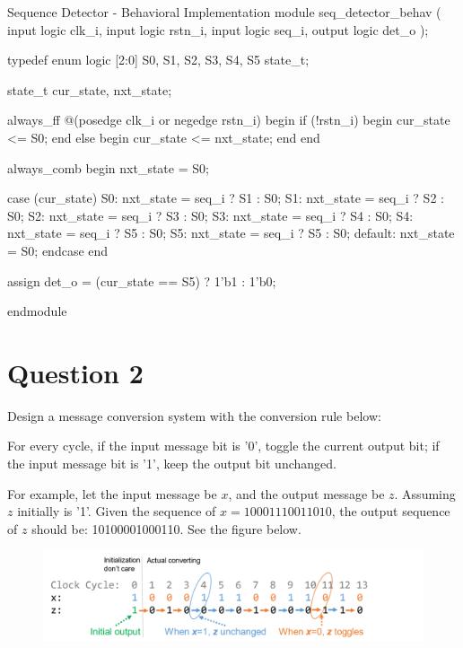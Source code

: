 \documentclass[../main.tex]{subfiles}
\begin{document}
\newpage

\begin{svminted}{Sequence Detector - Behavioral Implementation}
module seq_detector_behav (
    input   logic clk_i,
    input   logic rstn_i,
    input   logic seq_i,
    output  logic det_o
  );

  typedef enum logic [2:0] {
    S0,
    S1,
    S2,
    S3,
    S4,
    S5
  } state_t;

  state_t cur_state, nxt_state;

  always_ff @(posedge clk_i or negedge rstn_i) begin
    if (!rstn_i) begin
      cur_state <= S0;
    end
    else begin
      cur_state <= nxt_state;
    end
  end

  always_comb begin
    nxt_state = S0;

    case (cur_state)
      S0: nxt_state = seq_i ? S1 : S0;
      S1: nxt_state = seq_i ? S2 : S0;
      S2: nxt_state = seq_i ? S3 : S0;
      S3: nxt_state = seq_i ? S4 : S0;
      S4: nxt_state = seq_i ? S5 : S0;
      S5: nxt_state = seq_i ? S5 : S0;
      default: nxt_state = S0;
    endcase
  end

  assign det_o = (cur_state == S5) ? 1'b1 : 1'b0;

endmodule
\end{svminted}

\newpage

\section{Question 2}

Design a message conversion system with the conversion rule below:

For every cycle, if the input message bit is '0', toggle the current output bit; if the input message bit is '1', keep the output bit unchanged.

For example, let the input message be $x$, and the output message be $z$. Assuming $z$ initially is '1'. Given the sequence of $x = 10001110011010$, the output sequence of $z$ should be: 10100001000110. See the figure below.

\begin{figure}[h]
    \centering
    \includegraphics[width=\textwidth]{assets/q2.png}
\end{figure}
\end{document}
